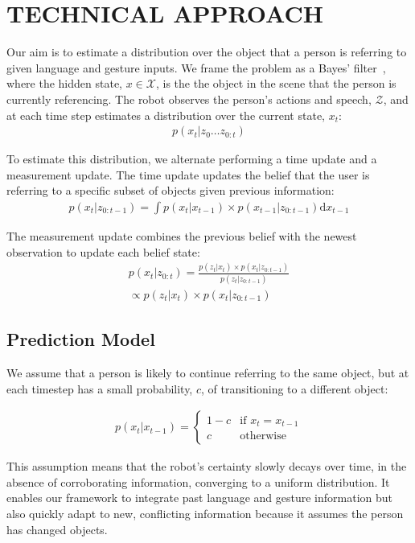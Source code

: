 \documentclass[letterpaper, 10 pt, conference]{ieeeconf}
\begin{document}
\section{TECHNICAL APPROACH}



Our aim is to estimate a distribution over the object that a person is
referring to given language and gesture inputs.  We frame the problem
as a Bayes' filter~\citep{thrun08}, where the hidden state,
$x \in \mathcal{X}$, is the the object in the scene that the person is
currently referencing. The robot observes the person's actions and
speech, $\mathcal{Z}$, and at each time step estimates a distribution
over the current state, $x_t$:
\begin{align}
  p(x_t | z_0 \dots z_{0:t})
\end{align}


To estimate this distribution, we alternate performing a time update
and a measurement update.  The time update updates the belief that the
user is referring to a specific subset of objects given previous
information:
\begin{align}
p(x_t | z_{0:t-1}) = \int p(x_t|x_{t-1})\times p(x_{t-1} | z_{0:t-1}) \text{d}x_{t-1}
\end{align}

The measurement update combines the previous belief with the newest observation to update each belief state: 
\begin{align}
p(x_t |z_{0:t}) = \frac{p(z_t | x_t) \times p(x_t | z_{0:t-1})}{p(z_t | z_{0:t-1})} \\\propto p(z_t | x_t) \times p(x_t | z_{0:t-1})
\end{align}



\subsection{Prediction Model}
We assume that a person is likely to continue referring to the same
object, but at each timestep has a small probability, $c$, of
transitioning to a different object: 

\begin{align}
p(x_t | x_{t-1}) = \left\{  \begin{array}{ll}
1-c &\mbox{if } x_t = x_{t-1}\\
c &\mbox{otherwise}
\end{array}\right.
\end{align}

This assumption means that the robot's certainty slowly decays over
time, in the absence of corroborating information, converging to a
uniform distribution.  It enables our framework to integrate past
language and gesture information but also quickly adapt to new,
conflicting information because it assumes the person has changed
objects.
\end{document}
